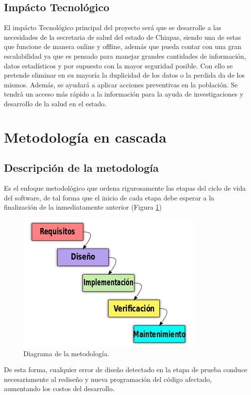 \subsection{Impácto Tecnológico}
El impácto Tecnológico principal del proyecto será que se desarrolle a las necesidades de la secretaria de salud del estado de Chiapas, siendo una de estas que funcione de manera online y offline, además que pueda contar con una gran escalabilidad ya que es pensado para manejar grandes cantidades de información, datos estadísticos y por supuesto con la mayor seguridad posible.  Con ello se pretende eliminar en su mayoría la duplicidad de los datos o la perdida da de los mismos. Además, se ayudará a aplicar acciones preventivas en la población. Se tendrá un acceso más rápido a la información para la ayuda de investigaciones y desarrollo de la salud en el estado.

\section{Metodología en cascada}
    \subsection{Descripción de la metodología}
      Es el enfoque metodológico que ordena rigurosamente las etapas del ciclo de vida
      del software, de tal forma que el inicio de cada etapa debe esperar a la finalización
      de la inmediatamente anterior (Figura \ref{metodologia})

      \begin{figure}[h]
        \centering
        \includegraphics[scale=.7]{lib/assets/cascada}
        \caption{Diagrama de la metodología.}
        \label{metodologia}
      \end{figure}


De esta forma, cualquier error de diseño detectado en la etapa de prueba conduce
necesariamente al rediseño y nueva programación del código afectado, aumentando
los costos del desarrollo.


